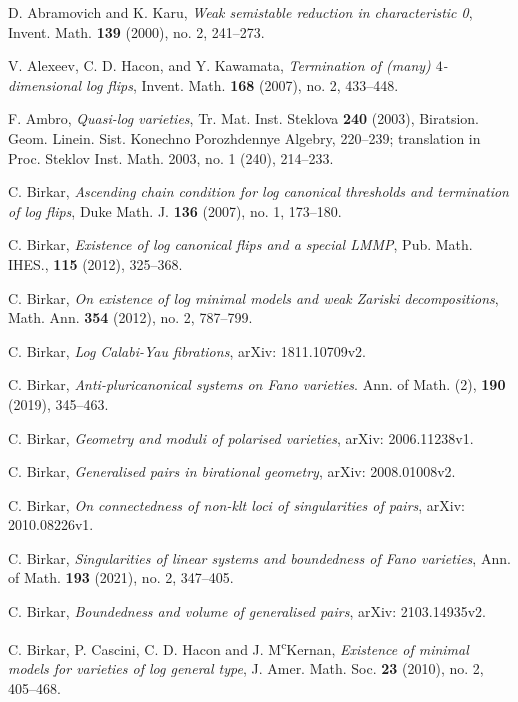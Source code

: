 \documentclass[11pt]{amsart}
\numberwithin{equation}{section}
\theoremstyle{definition}
\theoremstyle{definition}
\theoremstyle{definition}
\begin{document}
\begin{thebibliography}{99}

 D. Abramovich and K. Karu, \textit{Weak semistable reduction in characteristic 0}, Invent. Math. \textbf{139} (2000), no. 2, 241--273.

 V. Alexeev, C. D. Hacon, and Y. Kawamata, \textit{Termination of (many) $4$-dimensional log flips}, Invent. Math. \textbf{168} (2007), no. 2, 433--448.

 F. Ambro, \textit{Quasi-log varieties}, Tr. Mat. Inst. Steklova \textbf{240} (2003), Biratsion. Geom. Linein. Sist. Konechno Porozhdennye Algebry, 220--239; translation in Proc. Steklov Inst. Math. 2003, no. 1 (240), 214--233.

 C. Birkar, \textit{Ascending chain condition for log canonical thresholds and termination of log flips}, Duke Math. J. \textbf{136} (2007), no. 1, 173--180. 

 C. Birkar, \textit{Existence of log canonical flips and a special LMMP}, Pub. Math. IHES., \textbf{115} (2012), 325--368.

 C. Birkar, \textit{On existence of log minimal models and weak Zariski decompositions}, Math. Ann. \textbf{354} (2012), no. 2, 787--799.

 C. Birkar, \textit{Log Calabi-Yau fibrations}, arXiv: 1811.10709v2.
	
 C. Birkar, \textit{Anti-pluricanonical systems on Fano varieties}. Ann. of Math. (2), \textbf{190} (2019), 345--463.
	
 C. Birkar, \textit{Geometry and moduli of polarised varieties}, arXiv: 2006.11238v1.

 C. Birkar, \textit{Generalised pairs in birational geometry}, arXiv: 2008.01008v2.

 C. Birkar, \textit{On connectedness of non-klt loci of singularities of pairs}, arXiv: 2010.08226v1.

 C. Birkar, \textit{Singularities of linear systems and boundedness of Fano varieties}, Ann. of Math. \textbf{193} (2021), no. 2, 347--405.


 C. Birkar, \textit{Boundedness and volume of generalised pairs}, arXiv: 2103.14935v2.

C. Birkar, P. Cascini, C. D. Hacon and J. M\textsuperscript{c}Kernan, \textit{Existence of minimal models for varieties of log general type}, J. Amer. Math. Soc. \textbf{23} (2010), no. 2, 405--468.


\end{thebibliography}
\end{document}
